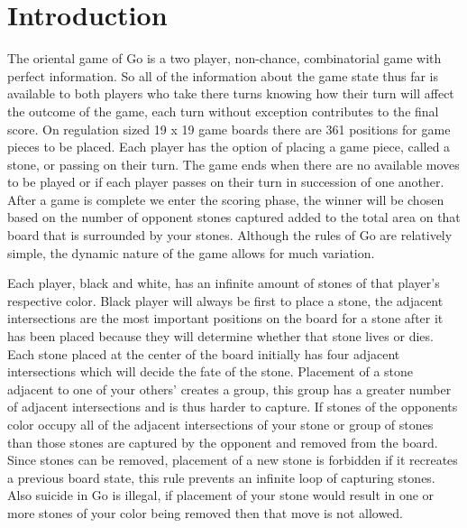 \documentclass[conference]{IEEEtran}
\begin{document}
\section{Introduction}
The oriental game of Go is a two player, non-chance, combinatorial game with perfect information. So all of the information about the game state thus far is available to both players who take there turns knowing how their turn will affect the outcome of the game, each turn without exception contributes to the final score. On regulation sized 19 x 19 game boards there are 361 positions for game pieces to be placed. Each player has the option of placing a game piece, called a stone, or passing on their turn. The game ends when there are no available moves to be played or if each player passes on their turn in succession of one another. After a game is complete we enter the scoring phase, the winner will be chosen based on the number of opponent stones captured added to the total area on that board that is surrounded by your stones. Although the rules of Go are relatively simple, the dynamic nature of the game allows for much variation.\par
Each player, black and white, has an infinite amount of stones of that player's respective color. Black player will always be first to place a stone, the adjacent intersections are the most important positions on the board for a stone after it has been placed because they will determine whether that stone lives or dies. Each stone placed at the center of the board initially has four adjacent intersections which will decide the fate of the stone. Placement of a stone adjacent to one of your others' creates a group, this group has a greater number of adjacent intersections and is thus harder to capture. If stones of the opponents color occupy all of the adjacent intersections of your stone or group of stones than those stones are captured by the opponent and removed from the board. Since stones can be removed, placement of a new stone is forbidden if it recreates a previous board state, this rule prevents an infinite loop of capturing stones. Also suicide in Go is illegal, if placement of your stone would result in one or more stones of your color being removed then that move is not allowed.
\end{document}
